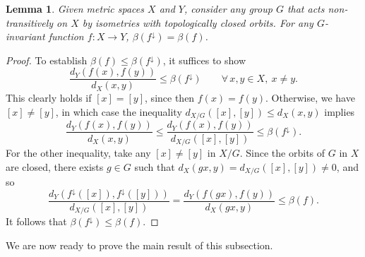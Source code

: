 \documentclass{article}
\theoremstyle{plain}
\newtheorem{lemma}[theorem]{Lemma}
\theoremstyle{definition}
\begin{document}
\begin{lemma}
\label{lem.down beta}
Given metric spaces $X$ and $Y$, consider any group $G$ that acts non-transitively on $X$ by isometries with topologically closed orbits.
For any $G$-invariant function $f\colon X\to Y$, $\beta(f^\downarrow)=\beta(f)$.
\end{lemma}

\begin{proof}
To establish $\beta(f)\leq\beta(f^\downarrow)$, it suffices to show
\[
\frac{d_Y(f(x),f(y))}{d_X(x,y)}
\leq\beta(f^\downarrow)
\qquad
\forall\,x,y\in X, ~x\neq y.
\]
This clearly holds if $[x]=[y]$, since then $f(x)=f(y)$.
Otherwise, we have $[x]\neq[y]$, in which case the inequality $d_{X/G}([x],[y])\leq d_X(x,y)$ implies
\[
\frac{d_Y(f(x),f(y))}{d_X(x,y)}
\leq\frac{d_Y(f(x),f(y))}{d_{X/G}([x],[y])}
\leq\beta(f^\downarrow).
\]
For the other inequality, take any $[x]\neq[y]$ in $X/G$.
Since the orbits of $G$ in $X$ are closed, there exists $g\in G$ such that $d_X(gx,y)=d_{X/G}([x],[y])\neq0$, and so
\[
\frac{d_Y(f^\downarrow([x]),f^\downarrow([y]))}{d_{X/G}([x],[y])}
=\frac{d_Y(f(gx),f(y))}{d_X(gx,y)}
\leq\beta(f).
\]
It follows that $\beta(f^\downarrow)\leq\beta(f)$.
\end{proof}

We are now ready to prove the main result of this subsection.
\end{document}
